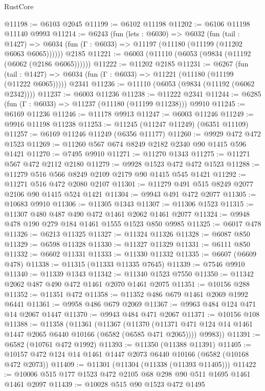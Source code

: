 \begin{lexlean}{RustCore}
\begin{coremodule}
@11198 := @6103 @2045
@11199 := @6102 @11198
@11202 := @6106 @11198 @11140 @9993
@11214 := @6243
    (fun (lets : @6030) =>
    @6032
      (fun (tail : @1427) =>
      @6034 (fun (Γ : @6033) => @11197 (@11180 (@11199 (@11202 @6063 @6065))))))
    @2185
@11221 := @6003 (@11110 (@6053 (@9834 (@11192 (@6062 (@2186 @6065))))))
@11222 := @11202 @2185
@11231 := @6267
    (fun (tail : @1427) => @6034 (fun (Γ : @6033) => @11221 (@11180 (@11199 (@11222 @6065)))))
    @2341
@11236 := @11110 (@6053 (@9834 (@11192 (@6062 @2342))))
@11237 := @6003 @11236
@11238 := @11222 @2341
@11244 := @6285 (fun (Γ : @6033) => @11237 (@11180 (@11199 @11238))) @9910
@11245 := @6169 @11236
@11246 := @11178 @9913
@11247 := @6003 @11246
@11249 := @9916 @11198 @11238
@11253 := @11245 (@11247 @11249) (@6351 @11109)
@11257 := @6169 @11246 @11249 (@6356 @11177)
@11260 := @9929 @472 @472 @1523
@11269 := @11260 @567 @674 @8249 @2182 @2340 @90 @1415 @596 @1421
@11270 := @7495 @9910
@11271 := @11270 @1343
@11275 := @11271 @567 @472 @2112 @2180
@11279 := @9928 @1523 @472 @472 @1523
@11288 := @11279 @516 @566 @8249 @2109 @2179 @90 @1415 @545 @1421
@11292 := @11271 @516 @472 @2080 @2107
@11301 := @11279 @491 @515 @8249 @2077 @2106 @90 @1415 @524 @1421
@11304 := @9943 @491 @472 @2077
@11305 := @10683 @9910
@11306 := @11305 @1343
@11307 := @11306 @1523
@11315 := @11307 @480 @487 @490 @472 @1461 @2062 @1461 @2077
@11324 := @9948 @478 @190 @279 @184 @1461 @1555 @1523 @850 @9985
@11325 := @6017 @478
@11326 := @6213 @11325
@11327 := @11324 @11326
@11328 := @6087 @850
@11329 := @6598 @11328
@11330 := @11327 @11329
@11331 := @6111 @850
@11332 := @6602 @11331
@11333 := @11330 @11332
@11335 := @6607 (@6609 @478)
@11338 := @11315 (@11333 @11335 @7645)
@11339 := @7546 @9910
@11340 := @11339 @1343
@11342 := @11340 @1523 @7550
@11350 := @11342 @2062 @487 @490 @472 @1461 @2070 @1461 @2075
@11351 := @10156 @288
@11352 := @11351 @472
@11358 := @11352 @486 @679 @1461 @2069 @1992 @6441
@11361 := @9958 @486 @679 @2069
@11367 := @9963 @484 @124 @471 @14 @2067 @1447
@11370 := @9943 @484 @471 @2067
@11371 := @10156 @108
@11388 := @11358
    (@11361
      (@11367
        (@11370 (@11371 @471 @124 @14 @1461 @1447 @2065 @6440 @10166 (@6582 (@6585 @471 @2065))))
        @9983))
@11391 := @6582 (@10761 @472 @1992)
@11393 := @11350 (@11388 @11391)
@11405 := @10157 @472 @124 @14 @1461 @1447 @2073 @6440 @10166 (@6582 (@10168 @472 @2073))
@11409 := @11301 (@11304 (@11338 (@11393 @11405)))
@11422 := @10006 @515 @177 @1523 @472 @2105 @68 @298 @90 @511 @1695 @1461 @1461 @2097
@11439 := @10028
    @515
    @90
    @1523
    @472
    @1495

\end{coremodule}
\end{lexlean}
